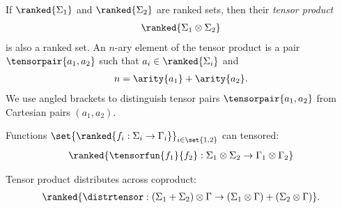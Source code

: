 \datatypefigure
{
If $\ranked{\Sigma_1}$ and $\ranked{\Sigma_2}$ are ranked sets, then  their \emph{tensor product}
\begin{align*}
    \ranked{\Sigma_1 \otimes \Sigma_2}
\end{align*}
is also a ranked set. An $n$-ary element of the tensor product is a pair $\tensorpair {a_1,a_2}$ such that $a_i \in \ranked{\Sigma_i}$ and 
\begin{align*}
    n = \arity{a_1} + \arity{a_2}.
\end{align*}
We use angled brackets to distinguish tensor pairs $\tensorpair{a_1,a_2}$ from Cartesian pairs $(a_1,a_2)$. 
}
{
       \item Functions $\set{\ranked{f_i : \Sigma_i \to \Gamma_i}}_{i \in \set{1,2}}$ can tensored: 
       \begin{align*}
           \ranked{\tensorfun{f_1}{f_2} : \Sigma_1 \otimes \Sigma_2 \to  \Gamma_1 \otimes \Gamma_2}
       \end{align*}
       \item Tensor  product distributes across coproduct:
       \begin{align*}
           \ranked{\distrtensor : (\Sigma_1 + \Sigma_2)\otimes \Gamma \to (\Sigma_1 \otimes \Gamma) + (\Sigma_2 \otimes \Gamma)}.
       \end{align*} 
}

